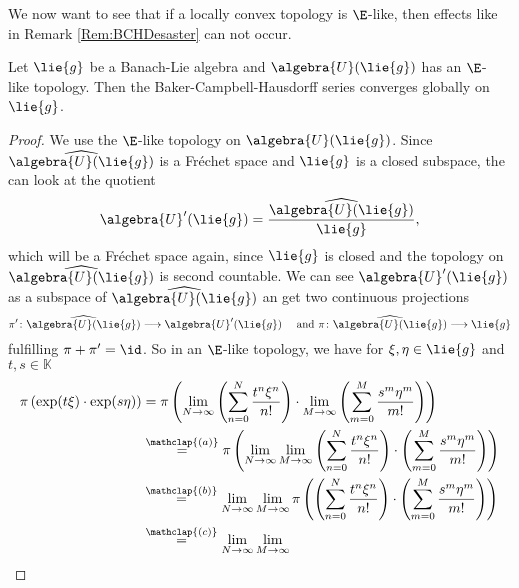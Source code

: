 \documentclass[
11pt,                          %
english                        %
]{article}
\newcommand\ot[2]{\stackrel{\mathclap{#1}}{#2}}
\begin{document}
We now want to see that if a locally convex topology is $\E$-like, then effects 
like in Remark \ref{Rem:BCHDesaster} can not occur. 
\begin{proposition}
	Let $\lie{g}$ be a Banach-Lie algebra and $\algebra{U}(\lie{g})$ has an $\E$-
	like topology. Then the Baker-Campbell-Hausdorff series converges globally on 
	$\lie{g}$.
\end{proposition}
\begin{proof}
	We use the $\E$-like topology on $\algebra{U}(\lie{g})$.
	Since $\widehat{\algebra{U}(\lie{g})}$ is a Fr\'echet space and $\lie{g}$ is a 
	closed subspace, the can look at the quotient 
	\begin{equation*}
		\algebra{U}'(\lie{g})
		=
		\frac{\widehat{\algebra{U}(\lie{g})}}{\lie{g}},
	\end{equation*}
	which will be a Fr\'echet space again, since $\lie{g}$ is closed and the 
	topology on $\widehat{\algebra{U}(\lie{g})}$ is second countable. We can see 
	$\algebra{U}'(\lie{g})$ as a subspace of $\widehat{\algebra{U}(\lie{g})}$ an 
	get two continuous projections
	\begin{equation*}
		\pi' \colon
		\widehat{\algebra{U}(\lie{g})}
		\longrightarrow
		\algebra{U}'(\lie{g})
		\quad \text{ and }
		\pi \colon
		\widehat{\algebra{U}(\lie{g})}
		\longrightarrow
		\lie{g}
	\end{equation*}
	fulfilling $\pi + \pi' = \id$. So in an $\E$-like topology, we have for $\xi, 
	\eta \in \lie{g}$ and $t,s \in \mathbb{K}$
	\begin{align*}
		\pi \left( \exp(t \xi) \cdot \exp(s \eta) \right)
		& =
		\pi
		\left(
			\lim_{N \rightarrow \infty}
			\left(
				\sum\limits_{n=0}^N
				\frac{t^n \xi^n}{n!}
			\right)
			\cdot
			\lim_{M \rightarrow \infty}
			\left(
				\sum\limits_{m=0}^M
				\frac{s^m \eta^m}{m!}
			\right)
		\right)
		\\
		& \ot{(a)}{=}
		\pi
		\left(
			\lim_{N \rightarrow \infty}
			\lim_{M \rightarrow \infty}
			\left(
				\sum\limits_{n=0}^N
				\frac{t^n \xi^n}{n!}
			\right)
			\cdot
			\left(
				\sum\limits_{m=0}^M
				\frac{s^m \eta^m}{m!}
			\right)
		\right)
		\\
		& \ot{(b)}{=}
		\lim_{N \rightarrow \infty}
		\lim_{M \rightarrow \infty}
		\pi
		\left(	
			\left(
				\sum\limits_{n=0}^N
				\frac{t^n \xi^n}{n!}
			\right)
			\cdot
			\left(
				\sum\limits_{m=0}^M
				\frac{s^m \eta^m}{m!}
			\right)
		\right)
		\\
		& \ot{(c)}{=}
		\lim_{N \rightarrow \infty}
		\lim_{M \rightarrow \infty}

\end{align*}
\end{proof}
\end{document}

